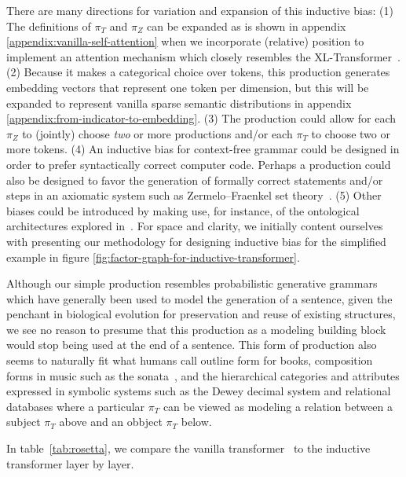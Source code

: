 \documentclass{article}
\begin{document}
There are many directions for variation and expansion of this inductive bias: (1) The definitions of $\pi_T$ and $\pi_Z$ can be expanded as is shown in appendix \ref{appendix:vanilla-self-attention} when we incorporate (relative) position to implement an attention mechanism which closely resembles the XL-Transformer~\cite{dai2019transformerxl}.  (2) Because it makes a categorical choice over tokens, this production generates embedding vectors that represent one token per dimension, but this will be expanded to represent vanilla sparse semantic distributions in appendix \ref{appendix:from-indicator-to-embedding}.  (3) The production could allow for each $\pi_Z$ to (jointly) choose \emph{two} or more productions and/or each $\pi_T$ to choose two or more tokens. (4) An inductive bias for context-free grammar could be designed in order to prefer syntactically correct computer code.  Perhaps a production could also be designed to favor the generation of formally correct statements and/or steps in an axiomatic system such as Zermelo–Fraenkel set theory~\citep{hrbacek2017introduction}. (5) Other biases could be introduced by making use, for instance, of the ontological architectures explored in~\cite{gruber1993translation, gruber1995toward}. For space and clarity, we initially content ourselves with presenting our methodology for designing inductive bias for the simplified example in figure \ref{fig:factor-graph-for-inductive-transformer}.

Although our simple production resembles probabilistic generative grammars which have generally been used to model the generation of a sentence, given the penchant in biological evolution for preservation and reuse of existing structures, we see no reason to presume that this production as a modeling building block would stop being used at the end of a sentence.  This form of production also seems to naturally fit what humans call outline form for books, composition forms in music such as the sonata~\citep{Lerdahl1983}, and the hierarchical categories and attributes expressed in symbolic systems such as the Dewey decimal system and relational databases where a particular $\pi_T$ can be viewed as modeling a relation between a subject $\pi_T$ above and an obbject $\pi_T$ below.

In table~\ref{tab:rosetta}, we compare the vanilla transformer~\citep{vaswani2017attention} to the inductive transformer layer by layer.
\end{document}
